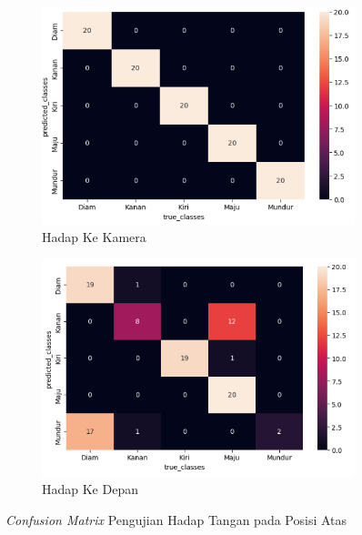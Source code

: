 \begin{enumerate}
  \begin{figure}[H]
    \centering
    \begin{subfigure}{0.7\textwidth}
      \centering
      \includegraphics[width=\linewidth]{../Gambar/cmatashadapkamera.png}
      \caption{Hadap Ke Kamera}
      \label{fig:cmatashadapkamera}
    \end{subfigure}
    \begin{subfigure}{0.7\textwidth}
      \centering
      \includegraphics[width=\linewidth]{../Gambar/cmatashadaplurus.png}
      \caption{Hadap Ke Depan}
      \label{fig:cmatashadaplurus}
    \end{subfigure}
    \centering
    \caption{\emph{Confusion Matrix} Pengujian Hadap Tangan pada Posisi Atas}
    \label{fig:cmatas}
  \end{figure}


\end{enumerate}
